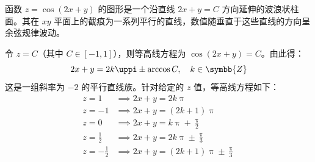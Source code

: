 \begin{solution}
    函数 $z = \cos(2x + y)$ 的图形是一个沿直线 $2x + y = C$ 方向延伸的波浪状柱面。其在 $xy$ 平面上的截痕为一系列平行的直线，数值随垂直于这些直线的方向呈余弦规律波动。

    \begin{center}
    \end{center}

    令 $z = C$（其中 $C \in [-1, 1]$），则等高线方程为 $\cos(2x + y) = C$。由此得：
    \begin{equation*}
        2x + y = 2k\uppi \pm \arccos C, \quad k \in \symbb{Z}
    \end{equation*}
    这是一组斜率为 $-2$ 的平行直线族。针对给定的 $z$ 值，等高线方程如下：
    \begin{equation*}
        \begin{aligned}
            z = 1            & \implies 2x + y = 2k\uppi                         \\
            z = -1           & \implies 2x + y = (2k+1)\uppi                     \\
            z = 0            & \implies 2x + y = k\uppi + \frac{\uppi}{2}        \\
            z = \frac{1}{2}  & \implies 2x + y = 2k\uppi \pm \frac{\uppi}{3}     \\
            z = -\frac{1}{2} & \implies 2x + y = (2k+1)\uppi \pm \frac{\uppi}{3}
        \end{aligned}
    \end{equation*}


\end{solution}
